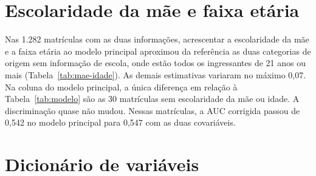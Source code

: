 \documentclass[12pt,a4paper]{article}
\newcommand{\tabela}[1]{\sbox\caixatabela{}%
  \ifdim\wd\caixatabela>\linewidth \resizebox{\linewidth}{!}{\usebox\caixatabela}%
  \else\ifdim\dimexpr\ht\caixatabela+\dp\caixatabela\relax>0.80\textheight
    \resizebox*{!}{0.80\textheight}{\usebox\caixatabela}%
  \else\usebox\caixatabela\fi\fi}
\begin{document}
\section{Escolaridade da mãe e faixa etária}
\label{apendice:mae-idade}

Nas 1.282 matrículas com as duas informações, acrescentar a escolaridade da mãe e a faixa etária ao modelo principal aproximou da referência as duas categorias de origem sem informação de escola, onde estão todos os ingressantes de 21 anos ou mais (Tabela~\ref{tab:mae-idade}). As demais estimativas variaram no máximo 0,07. Na coluna do modelo principal, a única diferença em relação à Tabela~\ref{tab:modelo} são as 30 matrículas sem escolaridade da mãe ou idade. A discriminação quase não mudou. Nessas matrículas, a AUC corrigida passou de 0,542 no modelo principal para 0,547 com as duas covariáveis.

\begin{table}[H]
  \centering
  \caption[Risco relativo com escolaridade da mãe e faixa etária]{RR do modelo principal e do modelo com escolaridade da mãe e faixa etária, nas mesmas 1.282 matrículas (324 evasões), pela regressão de Poisson modificada com variância HC3. Os dois modelos incluem também sexo, cor/raça, curso e coorte. Nas linhas da renda, da origem, da escolaridade da mãe e da faixa etária, o $p$ é o do teste global de Wald.}
  \label{tab:mae-idade}
  \tabela{tab_tcc_mae_idade.tex}
\end{table}

\clearpage
\section{Dicionário de variáveis}
\label{apendice:variaveis}
\end{document}

